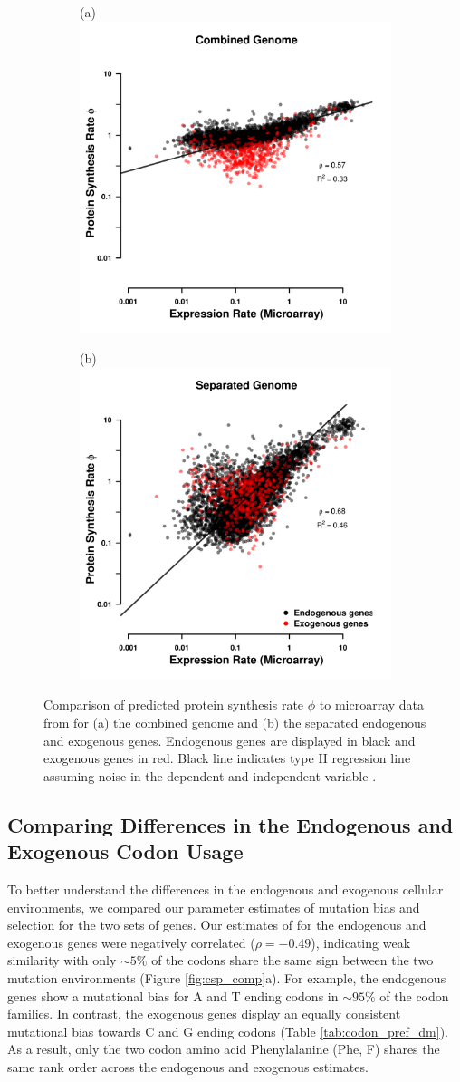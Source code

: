 \documentclass[fleqn,letterpaper]{article}
\begin{document}
\begin{figure}
    \centering
    \begin{subfigure}
        \centering
        (a) \includegraphics[width=.45\textwidth]{img/phi_corr_plot_whole_Genome_estim.pdf}
    \end{subfigure}
    \begin{subfigure}
        \centering
        (b) \includegraphics[width=.45\textwidth]{img/phi_corr_plot_split_Genome_estim.pdf}
    \end{subfigure}
    \caption{Comparison of predicted protein synthesis rate $\phi$ to microarray data from \citet{tsankov2010} for (a) the combined genome and (b) the separated endogenous and exogenous genes. 
    Endogenous genes are displayed in black and exogenous genes in red. 
    Black line indicates type II regression line assuming noise in the dependent and independent variable \citep{SokalAndRohlf1981}.}
    \label{fig:phi_corr_two_cond}
\end{figure}


\subsection*{Comparing Differences in the Endogenous and Exogenous Codon Usage}
To better understand the differences in the endogenous and exogenous cellular environments, we compared our parameter estimates of mutation bias \DM and selection \DE for the two sets of genes.
Our estimates of \DM for the endogenous and exogenous genes were negatively correlated ($\rho = -0.49$),  indicating weak similarity with only $\sim5\%$ of the codons share the same sign between the two mutation environments (Figure \ref{fig:csp_comp}a).
For example, the endogenous genes show a mutational bias for A and T ending codons in $\sim95\%$ of the codon families.
In contrast, the exogenous genes display an equally consistent mutational bias towards C and G ending codons (Table \ref{tab:codon_pref_dm}).
As a result, only the two codon amino acid Phenylalanine (Phe, F) shares the same rank order across the endogenous and exogenous \DM estimates.
\end{document}
